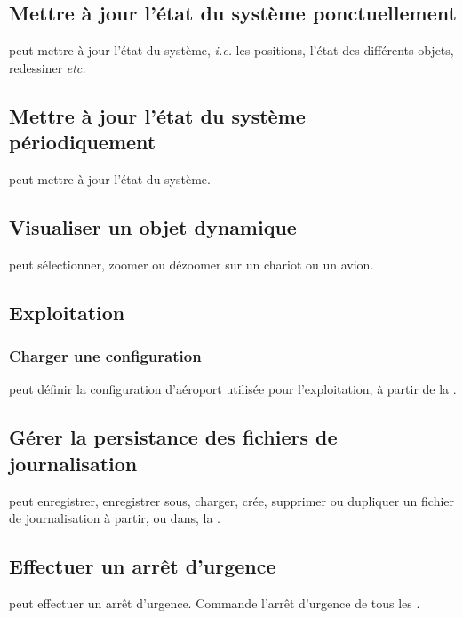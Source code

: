 \subsection{Mettre à jour l'état du système ponctuellement}
 peut mettre à jour l'état du système, \textsl{i.e.} les positions, l'état des différents objets, redessiner \textsl{etc.}

\subsection{Mettre à jour l'état du système périodiquement}
 peut mettre à jour l'état du système.

\subsection{Visualiser un objet dynamique}
 peut sélectionner, zoomer ou dézoomer sur un chariot ou un avion.
\subsection{Exploitation}

\subsubsection{Charger une configuration}
 peut définir la configuration d'aéroport utilisée pour l'exploitation, à partir de la .

\subsection{Gérer la persistance des fichiers de journalisation}
 peut enregistrer, enregistrer sous, charger, crée, supprimer ou dupliquer un fichier de journalisation à partir, ou dans, la .

\subsection{Effectuer un arrêt d'urgence}
 peut effectuer un arrêt d'urgence. Commande l'arrêt d'urgence de tous les .

